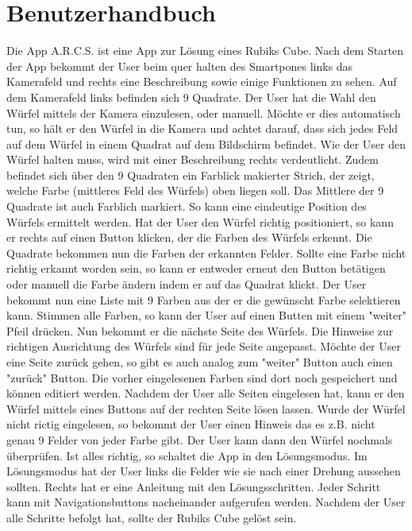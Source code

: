 \section{Benutzerhandbuch}  %

Die App A.R.C.S. ist eine App zur Lösung eines Rubiks Cube. Nach dem Starten der
App bekommt der User beim quer halten des Smartpones links das Kamerafeld und
rechts eine Beschreibung sowie einige Funktionen zu sehen. Auf dem Kamerafeld
links befinden sich 9 Quadrate. Der User hat die Wahl den Würfel mittels der
Kamera einzulesen, oder manuell. Möchte er dies automatisch tun, so hält er den
Würfel in die Kamera und achtet darauf, dass sich jedes Feld auf dem Würfel in
einem Quadrat auf dem Bildschirm befindet. Wie der User den Würfel halten muss,
wird mit einer Beschreibung rechts verdeutlicht. Zudem befindet sich über den 9
Quadraten ein Farblick makierter Strich, der zeigt, welche Farbe (mittleres Feld
des Würfels) oben liegen soll. Das Mittlere der 9 Quadrate ist auch Farblich
markiert. So kann eine eindeutige Position des Würfels ermittelt werden. Hat der
User den Würfel richtig positioniert, so kann er rechts auf einen Button
klicken, der die Farben des Würfels erkennt. Die Quadrate bekommen nun die
Farben der erkannten Felder. Sollte eine Farbe nicht richtig erkannt worden
sein, so kann er entweder erneut den Button betätigen oder manuell die Farbe
ändern indem er auf das Quadrat klickt. Der User bekommt nun eine Liste mit 9
Farben aus der er die gewünscht Farbe selektieren kann. Stimmen alle Farben, so
kann der User auf einen Butten mit einem "weiter" Pfeil drücken. Nun bekommt er
die nächste Seite des Würfels. Die Hinweise zur richtigen Ausrichtung des
Würfels sind für jede Seite angepasst. Möchte der User eine Seite zurück gehen,
so gibt es auch analog zum "weiter" Button auch einen "zurück" Button. Die
vorher eingelesenen Farben sind dort noch gespeichert und können editiert
werden. Nachdem der User alle Seiten eingelesen hat, kann er den Würfel mittels
eines Buttons auf der rechten Seite lösen lassen. Wurde der Würfel nicht rictig
eingelesen, so bekommt der User einen Hinweis das es z.B. nicht genau 9 Felder
von jeder Farbe gibt. Der User kann dann den Würfel nochmals überprüfen. Ist
alles richtig, so schaltet die App in den Lösungsmodus. Im Lösungsmodus hat der
User links die Felder wie sie nach einer Drehung aussehen sollten. Rechts hat er
eine Anleitung mit den Lösungsschritten. Jeder Schritt kann mit
Navigationsbuttons nacheinander aufgerufen werden. Nachdem der User alle
Schritte befolgt hat, sollte der Rubiks Cube gelöst sein.

